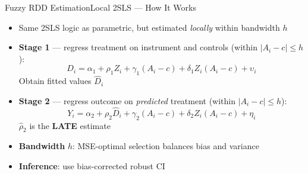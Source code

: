 \documentclass[hyperref={pdfpagelabels=false}]{beamer}
\begin{document}
\begin{frame}{Fuzzy RDD Estimation}{Local 2SLS --- How It Works}
	\begin{itemize}
		\item Same 2SLS logic as parametric, but estimated \emph{locally} within bandwidth $h$
		\vspace{0.15cm}
		\item \textbf{Stage 1} --- regress treatment on instrument and controls (within $|A_i-c|\leq h$):
		\begin{equation*}
			D_i = \alpha_1 + \rho_1 Z_i + \gamma_1(A_i-c) + \delta_1 Z_i(A_i-c) + \upsilon_i
		\end{equation*}
		Obtain fitted values $\hat{D}_i$
		\vspace{0.15cm}
		\item \textbf{Stage 2} --- regress outcome on \emph{predicted} treatment (within $|A_i-c|\leq h$):
		\begin{equation*}
			Y_i = \alpha_2 + \rho_2 \hat{D}_i + \gamma_2(A_i-c) + \delta_2 Z_i(A_i-c) + \eta_i
		\end{equation*}
		$\hat{\rho}_2$ is the \textbf{LATE} estimate
		\vspace{0.15cm}
		\item \textbf{Bandwidth} $h$: MSE-optimal selection balances bias and variance
		\vspace{0.1cm}
		\item \textbf{Inference}: use bias-corrected robust CI \citep{Calonico2014}
	\end{itemize}
\end{frame}




\end{document}
